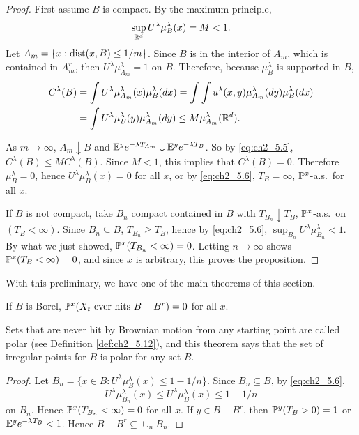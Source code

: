 \begin{proof}
First assume $B$ is compact. By the maximum principle,
\[
    \sup_{\R^d} U^\lambda\mu_B^\lambda(x) = M < 1.
\]
Let $A_m = \{x : \dist(x,B) \leq 1/m\}$. Since $B$ is in the interior of $A_m$, which is contained in $A_m^r$, then $U^\lambda\mu_{A_m}^{\lambda} = 1$ on $B$. Therefore, because $\mu_B^\lambda$ is supported in $B$,
\begin{align*}
    C^\lambda(B) &= \int U^\lambda\mu_{A_m}^\lambda(x)\mu_B^\lambda(dx) = \int\int u^\lambda(x,y)\mu_{A_m}^\lambda(dy)\mu_B^\lambda(dx) \\
    &= \int U^\lambda\mu_B^\lambda(y)\mu_{A_m}^\lambda(dy) \leq M\mu_{A_m}^\lambda(\R^d).
\end{align*}

As $m \to \infty$, $A_m \downarrow B$ and $\E^ye^{-\lambda T_{A_m}} \downarrow \E^ye^{-\lambda T_B}$. So by \eqref{eq:ch2_5.5}, $C^\lambda(B) \leq MC^\lambda(B)$. Since $M < 1$, this implies that $C^\lambda(B) = 0$. Therefore $\mu_B^\lambda = 0$, hence $U^\lambda\mu_B^\lambda(x) = 0$ for all $x$, or by \eqref{eq:ch2_5.6}, $T_B = \infty$, $\P^x$-a.s.\ for all $x$.

If $B$ is not compact, take $B_n$ compact contained in $B$ with $T_{B_n} \downarrow T_B$, $\P^x$-a.s.\ on $(T_B < \infty)$. Since $B_n \subseteq B$, $T_{B_n} \geq T_B$, hence by \eqref{eq:ch2_5.6}, $\sup_{B_n} U^\lambda\mu_{B_n}^\lambda < 1$. By what we just showed, $\P^x(T_{B_n} < \infty) = 0$. Letting $n \to \infty$ shows $\P^x(T_B < \infty) = 0$, and since $x$ is arbitrary, this proves the proposition.
\end{proof}

With this preliminary, we have one of the main theorems of this section.

\begin{theorem}\label{thm:ch2_5.5}
If $B$ is Borel, $\P^x(X_t~\text{ever hits}~B - B^r) = 0$ for all $x$.
\end{theorem}

Sets that are never hit by Brownian motion from any starting point are called polar (see Definition \ref{def:ch2_5.12}), and this theorem says that the set of irregular points for $B$ is polar for any set $B$.

\begin{proof}
Let $B_n = \{x \in B : U^\lambda\mu_B^\lambda(x) \leq 1 - 1/n\}$. Since $B_n \subseteq B$, by \eqref{eq:ch2_5.6},
\mpagebreak
\[
    U^\lambda\mu_{B_n}^\lambda(x) \leq U^\lambda\mu_B^\lambda(x) \leq 1-1/n
\]
on $B_n$. Hence $\P^x(T_{B_n} < \infty) = 0$ for all $x$. If $y \in B - B^r$, then $\P^y(T_B > 0) = 1$ or $\E^y e^{-\lambda T_B} < 1$. Hence $B - B^r \subseteq \cup_n B_n$.
\end{proof}

